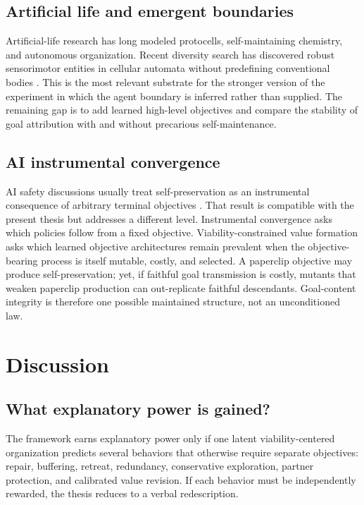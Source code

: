 \documentclass[11pt]{article}
\begin{document}
\subsection{Artificial life and emergent boundaries}

Artificial-life research has long modeled protocells, self-maintaining chemistry, and autonomous organization. Recent diversity search has discovered robust sensorimotor entities in cellular automata without predefining conventional bodies \citep{hamon2025}. This is the most relevant substrate for the stronger version of the experiment in which the agent boundary is inferred rather than supplied. The remaining gap is to add learned high-level objectives and compare the stability of goal attribution with and without precarious self-maintenance.

\subsection{AI instrumental convergence}

AI safety discussions usually treat self-preservation as an instrumental consequence of arbitrary terminal objectives \citep{omohundro2008,turner2021}. That result is compatible with the present thesis but addresses a different level. Instrumental convergence asks which policies follow from a fixed objective. Viability-constrained value formation asks which learned objective architectures remain prevalent when the objective-bearing process is itself mutable, costly, and selected. A paperclip objective may produce self-preservation; yet, if faithful goal transmission is costly, mutants that weaken paperclip production can out-replicate faithful descendants. Goal-content integrity is therefore one possible maintained structure, not an unconditioned law.

\section{Discussion}

\subsection{What explanatory power is gained?}

The framework earns explanatory power only if one latent viability-centered organization predicts several behaviors that otherwise require separate objectives: repair, buffering, retreat, redundancy, conservative exploration, partner protection, and calibrated value revision. If each behavior must be independently rewarded, the thesis reduces to a verbal redescription.
\end{document}
